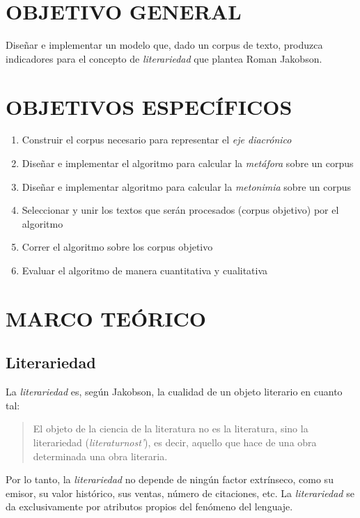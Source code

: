 \documentclass[12pt,letterpaper,twoside]{article}
\begin{document}
\section{OBJETIVO GENERAL}
\label{sec:org27c8da5}
Diseñar e implementar un modelo que, dado un corpus de texto, produzca
indicadores para el concepto de \emph{literariedad} que plantea Roman Jakobson.

\section{OBJETIVOS ESPECÍFICOS}
\label{sec:orga797f56}

\begin{enumerate}
\item Construir el corpus necesario para representar el \emph{eje diacrónico}
\item Diseñar e implementar el algoritmo para calcular la \emph{metáfora} sobre un corpus
\item Diseñar e implementar algoritmo para calcular la \emph{metonimia} sobre un corpus
\item Seleccionar y unir los textos que serán procesados (corpus objetivo) por el algoritmo
\item Correr el algoritmo sobre los corpus objetivo
\item Evaluar el algoritmo de manera cuantitativa y cualitativa
\end{enumerate}

\section{MARCO TEÓRICO}
\label{sec:org0d06c68}

\subsection{Literariedad}
\label{sec:org1f6b379}


La \emph{literariedad} es, según Jakobson, la cualidad de un objeto
literario en cuanto tal:

\begin{quote}

El objeto de la ciencia de la literatura no es la
literatura, sino la literariedad (\emph{literaturnost'}), es decir,
aquello que hace de una obra determinada una obra
literaria. \cite[pg. 37]{eijembaum2010teoria}
\end{quote}

Por lo tanto, la \emph{literariedad} no depende de ningún factor extrínseco,
como su emisor, su valor histórico, sus ventas,
número de citaciones, etc. La \emph{literariedad} se da exclusivamente por
atributos propios del fenómeno del lenguaje.
\end{document}
